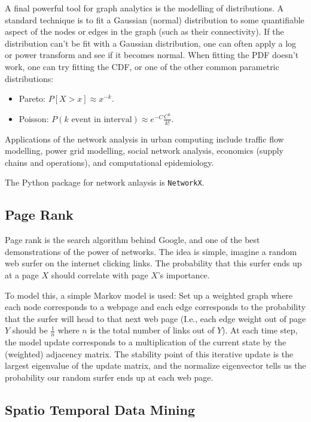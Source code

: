 \documentclass[12pt]{article}
\begin{document}
A final powerful tool for graph analytics is the modelling of distributions.
A standard technique is to fit a Gaussian (normal) distribution to
some quantifiable aspect of the nodes or edges in the graph (such as
their connectivity).
If the distribution can't be fit with a Gaussian distribution, 
one can often apply a log or power transform and see if it becomes normal.
When fitting the PDF doesn't work, one can try fitting the CDF, or one of
the other common parametric distributions:
\begin{itemize}
\item Pareto: $P[X > x] \approx x^{-k}$.
\item Poisson: $P(k \text{ event in interval}) \approx e^{-C} \frac{C^k}{k!}$.
\end{itemize}

Applications of the network analysis in urban computing include traffic flow 
modelling, power grid modelling, social network analysis, economics (supply 
chains and operations), and computational epidemiology.

The Python package for network anlaysis is {\tt NetworkX}.

\subsection*{Page Rank}

Page rank is the search algorithm behind Google, and one of the best
demonstrations of the power of networks.
The idea is simple, imagine a random web surfer on the internet clicking
links.
The probability that this surfer ends up at a page $X$ should correlate with 
page $X$'s importance.

To model this, a simple Markov model is used:
Set up a weighted graph where each node corresponds to a
webpage and each edge corresponds to the probability that the surfer will
head to that next web page (I.e., each edge weight out of page $Y$ should be 
$\frac{1}{n}$ where $n$ is the total number of links out of $Y$).
At each time step, the model update corresponds to a multiplication of the
current state by the (weighted) adjacency matrix.
The stability point of this iterative update is the largest eigenvalue of
the update matrix, and the normalize eigenvector tells us the probability our 
random surfer ends up at each web page.

\subsection*{Spatio Temporal Data Mining}
\end{document}
